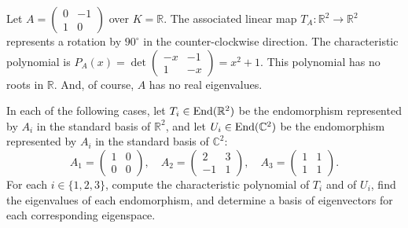 \begin{example}\label{ex:no_real_eigenvalues}
  Let $A = \left(\begin{smallmatrix} 0 & -1 \\ 1 & 0 \end{smallmatrix}\right)$ over $K = \mathbb{R}$. The associated linear map $T_A : \mathbb{R}^2 \rightarrow \mathbb{R}^2$ represents a rotation by $90^\circ$ in the counter-clockwise direction.
  The characteristic polynomial is $P_A(x) = \det\left(\begin{smallmatrix} -x & -1 \\ 1 & -x \end{smallmatrix}\right) = x^2 + 1$.
  This polynomial has no roots in $\mathbb{R}$. And, of course, $A$ has no real eigenvalues.
\end{example}

\begin{exercise}
  \label{exc:eigenvalues_eigenspaces_R_vs_C}
  In each of the following cases, let $T_i \in \operatorname{End}(\mathbb{R}^2)$ be the endomorphism represented by $A_i$ in the standard basis of $\mathbb{R}^2$, and let $U_i \in \operatorname{End}(\mathbb{C}^2)$ be the endomorphism represented by $A_i$ in the standard basis of $\mathbb{C}^2$:
  \[
  A_1 = \begin{pmatrix} 1 & 0 \\ 0 & 0 \end{pmatrix}, \quad
  A_2 = \begin{pmatrix} 2 & 3 \\ -1 & 1 \end{pmatrix}, \quad
  A_3 = \begin{pmatrix} 1 & 1 \\ 1 & 1 \end{pmatrix}.
  \]
  For each $i \in \{1, 2, 3\}$, compute the characteristic polynomial of $T_i$ and of $U_i$, find the eigenvalues of each endomorphism, and determine a basis of eigenvectors for each corresponding eigenspace.
\end{exercise}


